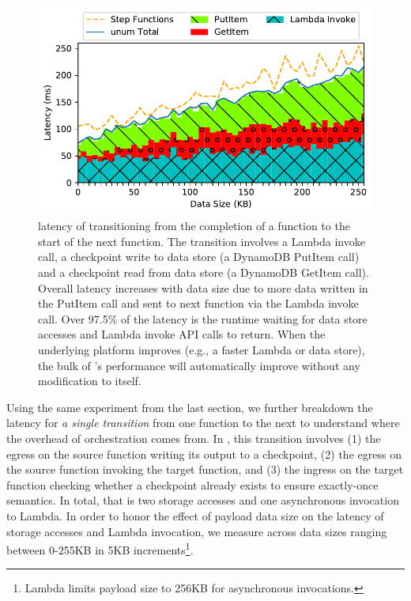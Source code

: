 \begin{figure}[t]
  \centering
  \includegraphics[width=\columnwidth]{figures/TotalAdditionalLatencyNBreakdown.pdf}
  \caption{\name{} latency of transitioning from the completion of a function
    to the start of the next function. The transition involves a Lambda
    invoke call, a checkpoint write to data store (a DynamoDB PutItem call)
    and a checkpoint read from data store (a DynamoDB GetItem call). Overall
    latency increases with data size due to more data written in the PutItem
    call and sent to next function via the Lambda invoke call. Over 97.5\% of
    the latency is the
    \name{} runtime waiting for data store accesses and Lambda invoke API
    calls to return. When the underlying platform improves (e.g., a faster
    Lambda or data store), the bulk of \name{}'s performance will
    automatically improve without any modification to \name{} itself.}
  \label{fig:single-transition-latency-breakdown}
\end{figure}

Using the same experiment from the last section, we further breakdown the
latency for \emph{a single transition} from one function to the next to
understand where the overhead of orchestration comes from. In \name{}, this
transition involves (1) the egress on the source function writing its output
to a checkpoint, (2) the egress on the source function invoking the target
function, and (3) the ingress on the target function checking whether a
checkpoint already exists to ensure exactly-once semantics. In total, that is
two storage accesses and one asynchronous invocation to Lambda. In order to
honor the effect of payload data size on the latency of storage accesses and
Lambda invocation, we measure across data sizes ranging between 0-255KB in 5KB
increments\footnote{Lambda limits payload size to 256KB for asynchronous
invocations.}.

